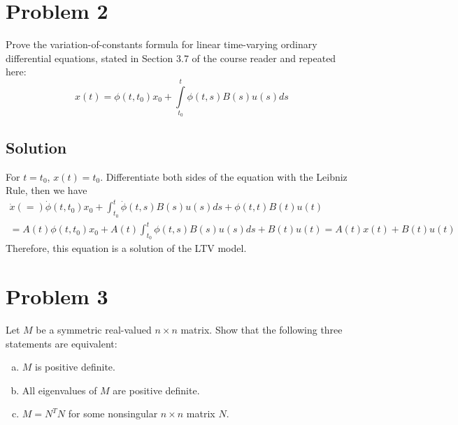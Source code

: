 \documentclass[11pt]{report}
\theoremstyle{definition}
\newcommand{\xlr}[2]{#1 \left(#2\right)}
\begin{document}
\section*{Problem 2}
Prove the variation-of-constants formula for linear time-varying ordinary differential equations, stated
in Section 3.7 of the course reader and repeated here:
\begin{equation}
\xlr{x}{t} = \xlr{\phi}{t, t_0} x_0 + \int \limits_{t_0} ^{t} \xlr{\phi}{t, s} \xlr{B}{s} \xlr{u}{s} ds
\end{equation}

\subsection*{Solution}
For $t = t_0$, $\xlr{x}{t} = t_0$. Differentiate both sides of the equation with the Leibniz Rule, then we have
\begin{multline*}
\xlr{\dot{x}} = \xlr{\dot{\phi}}{t, t_0} x_0 + \int_{t_0}^{t} \xlr{\dot{\phi}}{t, s} \xlr{B}{s} \xlr{u}{s} ds + \xlr{\phi}{t, t}B(t)u(t) \\= A(t)\xlr{\phi}{t, t_0} x_0 + A(t) \int_{t_0}^{t} \xlr{\phi}{t, s} \xlr{B}{s} \xlr{u}{s} ds + B(t)u(t) = A(t)x(t) + B(t)u(t)
\end{multline*}
Therefore, this equation is a solution of the LTV model.

\section*{Problem 3}
Let $M$ be a symmetric real-valued $n\times n$ matrix. Show that the following three statements are equivalent:

\begin{enumerate}[(a), noitemsep]
\item $M$ is positive definite.
\item All eigenvalues of $M$ are positive definite.
\item $ M = N^T N$ for some nonsingular $n \times n $ matrix $N$.
\end{enumerate}
\end{document}
